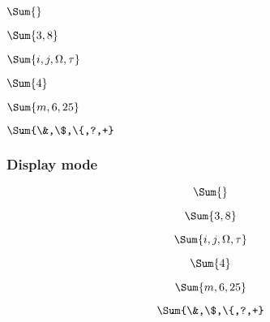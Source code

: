\begin{multicols}{2} %
\begin{verbbox}
$\Sum{}$
\end{verbbox}

\begin{verbbox}
$\Sum{3,8}$
\end{verbbox}

\begin{verbbox}
$\Sum{i,j,\Omega,\tau}$
\end{verbbox}
\begin{verbbox}
$\Sum{4}$
\end{verbbox}

\begin{verbbox}
$\Sum{m,6,25}$
\end{verbbox}

\begin{verbbox}
$\Sum{\&,\$,\{,?,+}$
\end{verbbox}
\end{multicols}

\subsubsection*{Display mode}

\begin{multicols}{2} %
\begin{verbbox}
$$\Sum{}$$
\end{verbbox}

\begin{verbbox}
$$\Sum{3,8}$$
\end{verbbox}

\begin{verbbox}
$$\Sum{i,j,\Omega,\tau}$$
\end{verbbox}
\begin{verbbox}
$$\Sum{4}$$
\end{verbbox}

\begin{verbbox}
$$\Sum{m,6,25}$$
\end{verbbox}

\begin{verbbox}
$$\Sum{\&,\$,\{,?,+}$$
\end{verbbox}
\end{multicols}

